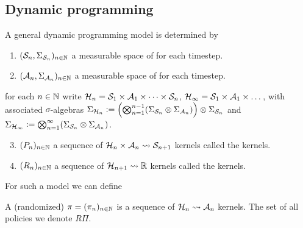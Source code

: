 \documentclass{article}
\begin{document}
\subsection{Dynamic programming}

\begin{defn}
  A general dynamic programming model is determined by
  \begin{enumerate}
    \item $(\mathcal{S}_n, \Sigma_{\mathcal{S}_n})_{n \in \mathbb{N}}$ a 
      measurable space of  for each timestep.
    \item $(\mathcal{A}_n, \Sigma_{\mathcal{A}_n})_{n \in \mathbb{N}}$ a 
      measurable space of  for each timestep.
  \end{enumerate}
  for each $n \in \mathbb{N}$ write $\mathcal{H}_n = \mathcal{S}_1 \times \mathcal{A}_1
  \times \dots \times \mathcal{S}_n$, $\mathcal{H}_\infty = \mathcal{S}_1
  \times \mathcal{A}_1 \times \dots$,
  with associated $\sigma$-algebras $ \Sigma_{\mathcal{H}_n} \vcentcolon= \left(
    \bigotimes_{n=1}^{n-1} (\Sigma_{\mathcal{S}_n} \otimes \Sigma_{\mathcal{A}_n})
  \right) \otimes \Sigma_{\mathcal{S}_n}$ and
  $\Sigma_{\mathcal{H}_\infty} \vcentcolon= 
  \bigotimes_{n=1}^{\infty} (\Sigma_{\mathcal{S}_n} \otimes \Sigma_{\mathcal{A}_n})$.

  \begin{enumerate} \setcounter{enumi}{2}
    \item $(P_n)_{n \in \mathbb{N}}$ a sequence of
      $\mathcal{H}_n \times \mathcal{A}_n \leadsto \mathcal{S}_{n+1}$ kernels
      called the  kernels.
    \item $(R_n)_{n \in \mathbb{N}}$ a sequence of
      $\mathcal{H}_{n+1} \leadsto \mathbb{R}$ kernels
      called the  kernels.
  \end{enumerate}
\end{defn}

For such a model we can define
\begin{defn}[Policy]
  A (randomized)  $\pi = (\pi_n)_{n \in \mathbb{N}}$
  is a sequence of $\mathcal{H}_n \leadsto \mathcal{A}_n$ kernels.
  The set of all policies we denote $R\Pi$.
\end{defn}
\end{document}
